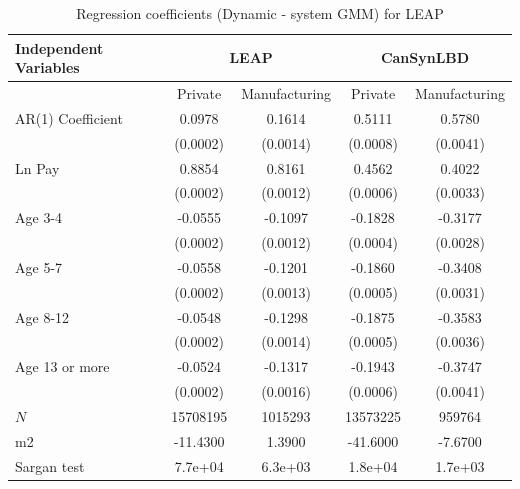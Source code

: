 \begin{table}[H]
  \centering
\begin{threeparttable}
 \caption{Regression coefficients (Dynamic - system GMM) for LEAP} \label{tab:Dynamic - system GMM_can} \medskip
\renewcommand{\arraystretch}{1}
\begin{tabular}{l|c c| c c}
\toprule
\textbf{Independent Variables}&\multicolumn{2}{c|}{\textbf{LEAP}} &  \multicolumn{2}{c}{\textbf{CanSynLBD}}\\
\midrule
&\multicolumn{1}{c}{Private}&\multicolumn{1}{c}{Manufacturing}&\multicolumn{1}{c}{Private}&\multicolumn{1}{c}{Manufacturing}\\
\hline
AR(1) Coefficient&   0.0978\sym{***}&   0.1614\sym{***}&   0.5111\sym{***}&   0.5780\sym{***}\\
          & (0.0002)         & (0.0014)         & (0.0008)         & (0.0041)         \\
[1em]
Ln Pay    &   0.8854\sym{***}&   0.8161\sym{***}&   0.4562\sym{***}&   0.4022\sym{***}\\
          & (0.0002)         & (0.0012)         & (0.0006)         & (0.0033)         \\
[1em]
Age 3-4   &  -0.0555\sym{***}&  -0.1097\sym{***}&  -0.1828\sym{***}&  -0.3177\sym{***}\\
          & (0.0002)         & (0.0012)         & (0.0004)         & (0.0028)         \\
[1em]
Age 5-7   &  -0.0558\sym{***}&  -0.1201\sym{***}&  -0.1860\sym{***}&  -0.3408\sym{***}\\
          & (0.0002)         & (0.0013)         & (0.0005)         & (0.0031)         \\
[1em]
Age 8-12  &  -0.0548\sym{***}&  -0.1298\sym{***}&  -0.1875\sym{***}&  -0.3583\sym{***}\\
          & (0.0002)         & (0.0014)         & (0.0005)         & (0.0036)         \\
[1em]
Age 13 or more&  -0.0524\sym{***}&  -0.1317\sym{***}&  -0.1943\sym{***}&  -0.3747\sym{***}\\
          & (0.0002)         & (0.0016)         & (0.0006)         & (0.0041)         \\
\hline
\(N\)     & 15708195         &  1015293         & 13573225         &   959764         \\
m2        & -11.4300         &   1.3900         & -41.6000         &  -7.6700         \\
Sargan test&  7.7e+04         &  6.3e+03         &  1.8e+04         &  1.7e+03         \\

\end{tabular}
\end{threeparttable}
\end{table}
